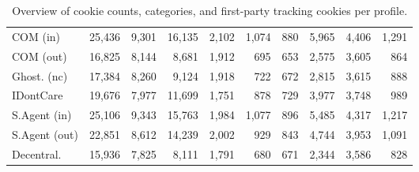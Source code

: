\begin{table}[H]
\begin{tabular}{lrrrrrrrrr}
    COM (in) & 25,436 & 9,301 & 16,135 & 2,102 & 1,074 & 880 & 5,965 & 4,406 & 1,291 \\
    COM (out) & 16,825 & 8,144 & 8,681 & 1,912 & 695 & 653 & 2,575 & 3,605 & 864 \\
    Ghost. (nc) & 17,384 & 8,260 & 9,124 & 1,918 & 722 & 672 & 2,815 & 3,615 & 888 \\
    IDontCare & 19,676 & 7,977 & 11,699 & 1,751 & 878 & 729 & 3,977 & 3,748 & 989 \\
    S.Agent (in) & 25,106 & 9,343 & 15,763 & 1,984 & 1,077 & 896 & 5,485 & 4,317 & 1,217 \\
    S.Agent (out) & 22,851 & 8,612 & 14,239 & 2,002 & 929 & 843 & 4,744 & 3,953 & 1,091 \\
    Decentral. & 15,936 & 7,825 & 8,111 & 1,791 & 680 & 671 & 2,344 & 3,586 & 828 \\
    \bottomrule
    \end{tabular}
    \caption{Overview of cookie counts, categories, and first-party tracking cookies per profile.}
    \end{table}
    
